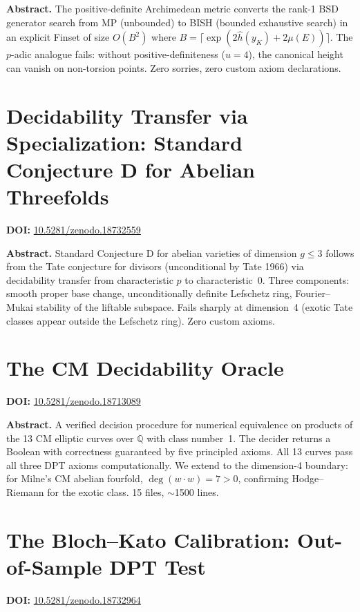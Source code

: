 \documentclass[11pt,a4paper]{article}
\begin{document}
\bigskip
\noindent\textbf{Abstract.}
The positive-definite Archimedean metric converts the rank-1 BSD generator search from MP (unbounded) to BISH (bounded exhaustive search) in an explicit Finset of size $O(B^2)$ where $B=\lceil\exp(2\hat{h}(y_K)+2\mu(E))\rceil$. The $p$-adic analogue fails: without positive-definiteness ($u=4$), the canonical height can vanish on non-torsion points. Zero sorries, zero custom axiom declarations.

\section{Decidability Transfer via Specialization: Standard Conjecture D for Abelian Threefolds}
\label{sec:p52}
\textbf{DOI:} \href{https://doi.org/10.5281/zenodo.18732559}{10.5281/zenodo.18732559}

\bigskip
\noindent\textbf{Abstract.}
Standard Conjecture D for abelian varieties of dimension $g\le3$ follows from the Tate conjecture for divisors (unconditional by Tate 1966) via decidability transfer from characteristic $p$ to characteristic~0. Three components: smooth proper base change, unconditionally definite Lefschetz ring, Fourier--Mukai stability of the liftable subspace. Fails sharply at dimension~4 (exotic Tate classes appear outside the Lefschetz ring). Zero custom axioms.

\section{The CM Decidability Oracle}
\label{sec:p53}
\textbf{DOI:} \href{https://doi.org/10.5281/zenodo.18713089}{10.5281/zenodo.18713089}

\bigskip
\noindent\textbf{Abstract.}
A verified decision procedure for numerical equivalence on products of the 13 CM elliptic curves over $\mathbb{Q}$ with class number~1. The decider returns a Boolean with correctness guaranteed by five principled axioms. All 13 curves pass all three DPT axioms computationally. We extend to the dimension-4 boundary: for Milne's CM abelian fourfold, $\deg(w\cdot w)=7>0$, confirming Hodge--Riemann for the exotic class. 15 files, $\sim$1500 lines.

\section{The Bloch--Kato Calibration: Out-of-Sample DPT Test}
\label{sec:p54}
\textbf{DOI:} \href{https://doi.org/10.5281/zenodo.18732964}{10.5281/zenodo.18732964}
\end{document}

